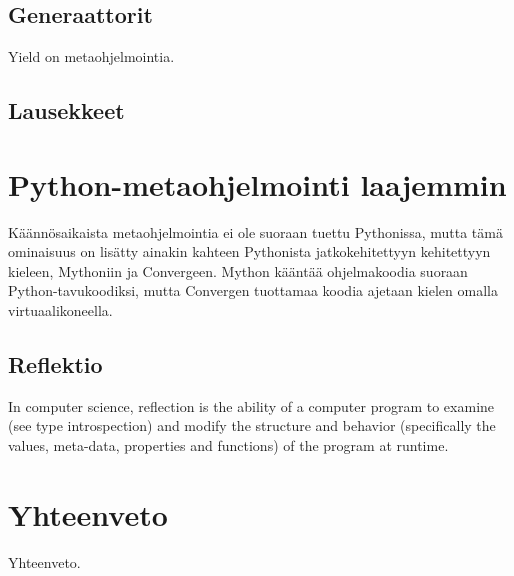 \documentclass[finnish]{tktltiki2}
\theoremstyle{definition}
\theoremstyle{remark}
\begin{document}
\subsection{Generaattorit}

Yield on metaohjelmointia.

\subsection{Lausekkeet}







\section{Python-metaohjelmointi laajemmin}


Käännösaikaista metaohjelmointia ei ole suoraan tuettu Pythonissa, mutta tämä ominaisuus on lisätty ainakin kahteen Pythonista jatkokehitettyyn kehitettyyn kieleen, Mythoniin\cite{mython} ja Convergeen\cite{tratt05}. Mython kääntää ohjelmakoodia suoraan Python-tavukoodiksi, mutta Convergen tuottamaa koodia ajetaan kielen omalla virtuaalikoneella.


\subsection{Reflektio}

In computer science, reflection is the ability of a computer program to examine (see type introspection) and modify the structure and behavior (specifically the values, meta-data, properties and functions) of the program at runtime.


\section{Yhteenveto}

Yhteenveto.


\pagebreak

%
%
% 
%




\lastpage
\end{document}
